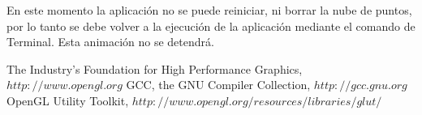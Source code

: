 \documentclass[]{article}
\begin{document}
\flushleft
En este momento la aplicación no se puede reiniciar, ni borrar la nube de puntos, por lo tanto se debe
volver a la ejecución de la aplicación mediante el comando de Terminal. Esta animación no se detendrá.

\newpage
\begin{thebibliography}{3}
 The Industry's Foundation for High Performance Graphics, $http://www.opengl.org$
  GCC, the GNU Compiler Collection, $http://gcc.gnu.org$
 OpenGL Utility Toolkit, $http://www.opengl.org/resources/libraries/glut/$
\end{thebibliography}
\end{document}
